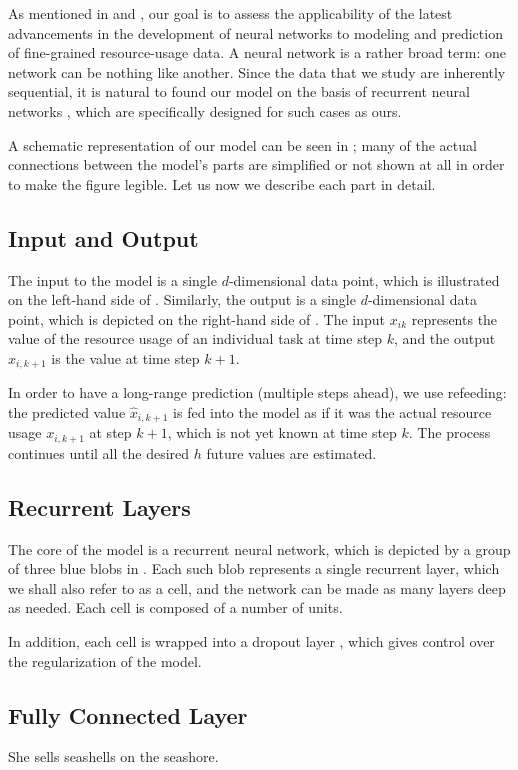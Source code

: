 
As mentioned in  and , our goal is to assess
the applicability of the latest advancements in the development of neural
networks \cite{goodfellow2016} to modeling and prediction of fine-grained
resource-usage data. A neural network is a rather broad term: one network can be
nothing like another. Since the data that we study are inherently sequential, it
is natural to found our model on the basis of recurrent neural networks
\cite{goodfellow2016}, which are specifically designed for such cases as ours.

A schematic representation of our model can be seen in ; many of the
actual connections between the model's parts are simplified or not shown at all
in order to make the figure legible. Let us now we describe each part in detail.

\subsection{Input and Output}
The input to the model is a single $d$-dimensional data point, which is
illustrated on the left-hand side of . Similarly, the output is a
single $d$-dimensional data point, which is depicted on the right-hand side of
. The input $x_{ik}$ represents the value of the resource usage of
an individual task at time step $k$, and the output $\hat{x}_{i,k + 1}$ is the
value at time step $k + 1$.

In order to have a long-range prediction (multiple steps ahead), we use
refeeding: the predicted value $\hat{x}_{i,k + 1}$ is fed into the model as if
it was the actual resource usage $x_{i,k + 1}$ at step $k + 1$, which is not
yet known at time step $k$. The process continues until all the desired $h$
future values are estimated.

\subsection{Recurrent Layers}
The core of the model is a recurrent neural network, which is depicted by a
group of three blue blobs in . Each such blob represents a single
recurrent layer, which we shall also refer to as a cell, and the network can be
made as many layers deep as needed. Each cell is composed of a number of units.

In addition, each cell is wrapped into a dropout layer \cite{zaremba2014}, which
gives control over the regularization of the model.

\subsection{Fully Connected Layer}
She sells seashells on the seashore.
